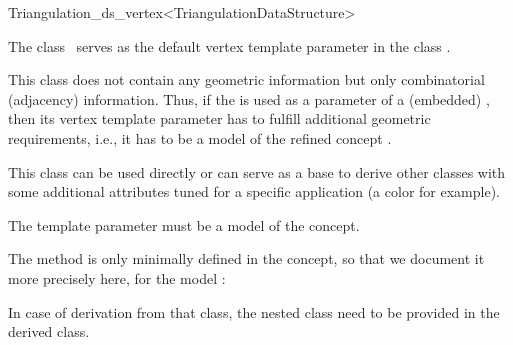 \begin{ccRefClass}{Triangulation_ds_vertex<TriangulationDataStructure>}

\ccDefinition

The class \ccRefName\ serves as the default vertex template parameter in the
class .

This class does not contain any geometric information but only combinatorial
(adjacency) information. Thus, if the  is
used as a parameter of a (embedded) , then its vertex template parameter
has to fulfill additional geometric requirements, {i.e.}, it has to be a
model of the refined concept .

This class can be used directly or can serve as a base to derive other classes
with some additional attributes tuned for a specific application (a color for
example).


\ccParameters

The template parameter  must be a model of the
 concept.

\ccIsModel



\begin{ccDebug}

The  method is only minimally defined in the
 concept, so that we document it more precisely
here, for the model \ccRefName:

\end{ccDebug}

\begin{ccAdvanced}
In case of derivation from that class, the nested class
 need to be provided in the derived class.
\end{ccAdvanced}



\ccSeeAlso

\\
\end{ccRefClass}
